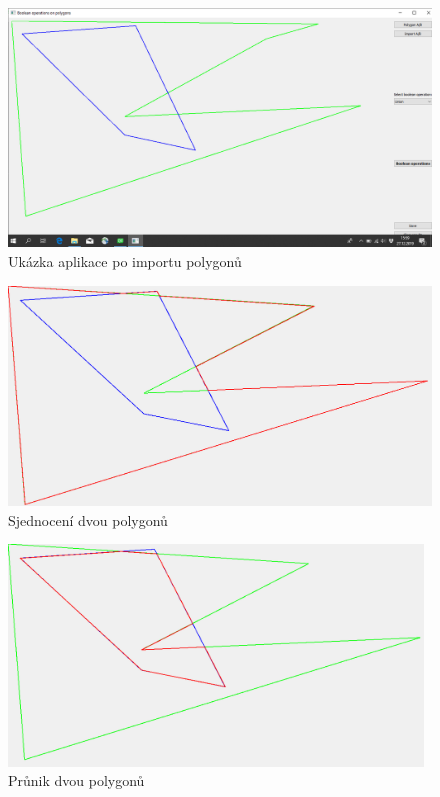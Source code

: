 \documentclass[a4paper,11pt,twoside]{article}
\begin{document}
\vspace{0.2cm}
\begin{figure}[hbt!] 
\begin{center}
\includegraphics[width=13cm]{pictures/import_polygonu.png}
\caption[Ukázka aplikace po importu polygonů]{Ukázka aplikace po importu polygonů}
\label{fig:import_polygonu}
\end{center}
\end{figure}

\vspace{0.2cm}
\begin{figure}[hbt!] 
\begin{center}
\includegraphics[width=13cm]{pictures/polygon_union.png} 
\caption[Sjednocení dvou polygonů]{Sjednocení dvou polygonů}
\label{fig:polygon_union}
\end{center}
\end{figure}

\begin{figure}[hbt!] 
\begin{center}
\includegraphics[width=11cm]{pictures/polygon_intersect.png} 
\caption[Průnik dvou polygonů]{Průnik dvou polygonů}
\label{fig:polygon_intersect}
\end{center}
\end{figure}
\end{document}
